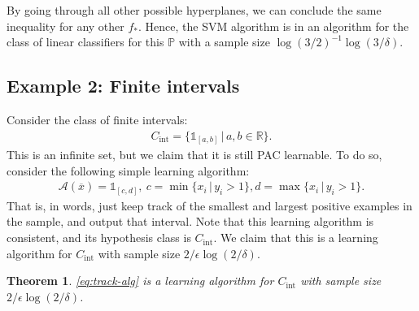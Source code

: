 \documentclass{article}
\newcommand{\calA}{\mathcal{A}}
\newcommand{\R}{\mathbb{R}}
\newtheorem{theorem}{Theorem}
\newcommand{\one}{\mathds{1}}
\begin{document}
By going through all other possible hyperplanes, we can conclude the same inequality for any other $f_*$. Hence, the SVM algorithm is in an algorithm for the class of linear classifiers for this $\mathbb{P}$ with a sample size $\log(3/2)^{-1}\log(3/\delta)$.

\subsection{Example 2: Finite intervals} 
Consider the class of finite intervals:
\begin{align*}
    C_{\mathrm{int}} = \{ \one_{[a,b]} \, \vert \, a,b \in \R\}.
\end{align*}
This is an infinite set, but we claim that it is still PAC learnable. To do so, consider the following simple learning algorithm:
\begin{align}
    \calA(\overline{x}) =\one_[c,d], \  c=\min \{x_i \, \vert \, y_i>1\}, d= \max \{x_i \, \vert \, y_i>1\}. \label{eq:track-alg}
\end{align}
That is, in words, just keep track of the smallest and largest positive examples in the sample, and output that interval. Note that this learning algorithm is consistent, and its hypothesis class is $C_{\mathrm{int}}$. We claim that this is a learning algorithm for $C_{\mathrm{int}}$ with sample size $2/\epsilon \log(2/\delta)$.
\begin{theorem}
    \eqref{eq:track-alg} is a learning algorithm for $C_{\mathrm{int}}$ with sample size  $2/\epsilon \log(2/\delta)$.
\end{theorem}
\end{document}
